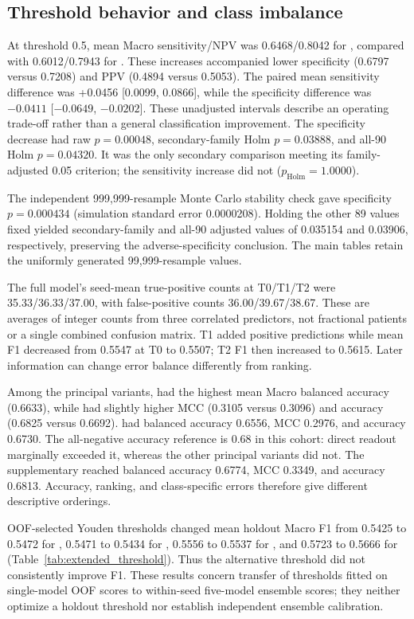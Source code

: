 \subsection{Threshold behavior and class imbalance}

At threshold 0.5, mean Macro sensitivity/NPV was 0.6468/0.8042 for \fullmodel{}, compared with 0.6012/0.7943 for \direct{}. These increases accompanied lower specificity (0.6797 versus 0.7208) and PPV (0.4894 versus 0.5053). The paired mean sensitivity difference was +0.0456 [0.0099, 0.0866], while the specificity difference was $-0.0411$ [$-0.0649$, $-0.0202$]. These unadjusted intervals describe an operating trade-off rather than a general classification improvement. The specificity decrease had raw $p=0.00048$, secondary-family Holm $p=0.03888$, and all-90 Holm $p=0.04320$. It was the only secondary comparison meeting its family-adjusted 0.05 criterion; the sensitivity increase did not ($p_{\mathrm{Holm}}=1.0000$).

The independent 999,999-resample Monte Carlo stability check gave specificity $p=0.000434$ (simulation standard error 0.0000208). Holding the other 89 values fixed yielded secondary-family and all-90 adjusted values of 0.035154 and 0.03906, respectively, preserving the adverse-specificity conclusion. The main tables retain the uniformly generated 99,999-resample values.

The full model's seed-mean true-positive counts at T0/T1/T2 were 35.33/36.33/37.00, with false-positive counts 36.00/39.67/38.67. These are averages of integer counts from three correlated predictors, not fractional patients or a single combined confusion matrix. T1 added positive predictions while mean F1 decreased from 0.5547 at T0 to 0.5507; T2 F1 then increased to 0.5615. Later information can change error balance differently from ranking.

Among the principal variants, \fullmodel{} had the highest mean Macro balanced accuracy (0.6633), while \direct{} had slightly higher MCC (0.3105 versus 0.3096) and accuracy (0.6825 versus 0.6692). \nojepa{} had balanced accuracy 0.6556, MCC 0.2976, and accuracy 0.6730. The all-negative accuracy reference is 0.68 in this cohort: direct readout marginally exceeded it, whereas the other principal variants did not. The supplementary \meanmodel{} reached balanced accuracy 0.6774, MCC 0.3349, and accuracy 0.6813. Accuracy, ranking, and class-specific errors therefore give different descriptive orderings.

OOF-selected Youden thresholds changed mean holdout Macro F1 from 0.5425 to 0.5472 for \nojepa{}, 0.5471 to 0.5434 for \direct{}, 0.5556 to 0.5537 for \fullmodel{}, and 0.5723 to 0.5666 for \meanmodel{} (Table~\ref{tab:extended_threshold}). Thus the alternative threshold did not consistently improve F1. These results concern transfer of thresholds fitted on single-model OOF scores to within-seed five-model ensemble scores; they neither optimize a holdout threshold nor establish independent ensemble calibration.

